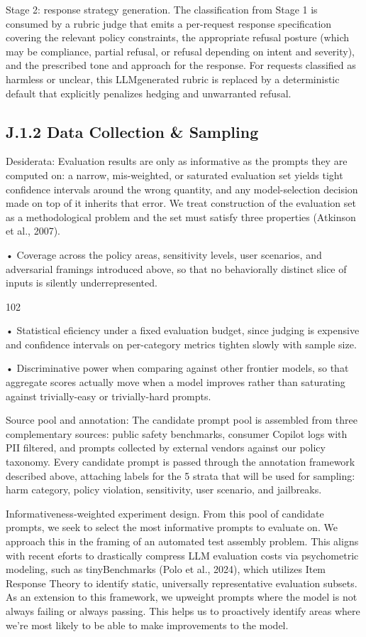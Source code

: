 \documentclass[
  10
]{article}
\begin{document}
Stage 2: response strategy generation. The classification from Stage 1
is consumed by a rubric judge that emits a per-request response
specification covering the relevant policy constraints, the appropriate
refusal posture (which may be compliance, partial refusal, or refusal
depending on intent and severity), and the prescribed tone and approach
for the response. For requests classified as harmless or unclear, this
LLMgenerated rubric is replaced by a deterministic default that
explicitly penalizes hedging and unwarranted refusal.

\subsection{J.1.2 Data Collection \&
Sampling}\label{j.1.2-data-collection-sampling}

Desiderata: Evaluation results are only as informative as the prompts
they are computed on: a narrow, mis-weighted, or saturated evaluation
set yields tight confidence intervals around the wrong quantity, and any
model-selection decision made on top of it inherits that error. We treat
construction of the evaluation set as a methodological problem and the
set must satisfy three properties (Atkinson et al., 2007).

• Coverage across the policy areas, sensitivity levels, user scenarios,
and adversarial framings introduced above, so that no behaviorally
distinct slice of inputs is silently underrepresented.

102

• Statistical eficiency under a fixed evaluation budget, since judging
is expensive and confidence intervals on per-category metrics tighten
slowly with sample size.

• Discriminative power when comparing against other frontier models, so
that aggregate scores actually move when a model improves rather than
saturating against trivially-easy or trivially-hard prompts.

Source pool and annotation: The candidate prompt pool is assembled from
three complementary sources: public safety benchmarks, consumer Copilot
logs with PII filtered, and prompts collected by external vendors
against our policy taxonomy. Every candidate prompt is passed through
the annotation framework described above, attaching labels for the 5
strata that will be used for sampling: harm category, policy violation,
sensitivity, user scenario, and jailbreaks.

Informativeness‐weighted experiment design. From this pool of candidate
prompts, we seek to select the most informative prompts to evaluate on.
We approach this in the framing of an automated test assembly problem.
This aligns with recent eforts to drastically compress LLM evaluation
costs via psychometric modeling, such as tinyBenchmarks (Polo et al.,
2024), which utilizes Item Response Theory to identify static,
universally representative evaluation subsets. As an extension to this
framework, we upweight prompts where the model is not always failing or
always passing. This helps us to proactively identify areas where we're
most likely to be able to make improvements to the model.
\end{document}
